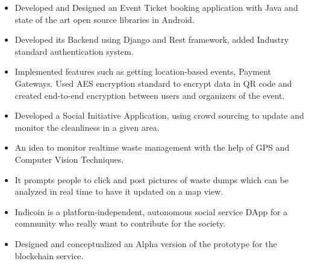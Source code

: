 \documentclass[10pt,a4paper,ragged2e]{altacv}
\begin{document}
\begin{itemize}
\item Developed and Designed an Event Ticket booking application with Java and state of the art open source libraries in Android.
\item  Developed its Backend using Django and Rest framework, added Industry standard authentication system.
\item   Implemented features such as getting location-based events, Payment Gateways. Used AES encryption standard to encrypt data in QR
 code and created end-to-end encryption between users and organizers of the event.

\end{itemize}

\begin{itemize}
\item Developed a Social Initiative Application, using crowd sourcing to update and monitor the cleanliness in a given area.
\item An idea to monitor realtime waste management with the help of GPS and Computer Vision Techniques.
\item It prompts people to click and post pictures of waste dumps which can be analyzed in real time to have it updated on a map view.
\end{itemize}
\divider

\begin{itemize}
\item Indicoin is a platform-independent, autonomous social service DApp for a community who really want to contribute for the society.
\item Designed and conceptualized an Alpha version of the prototype for the blockchain service.\end{itemize}
\end{document}
